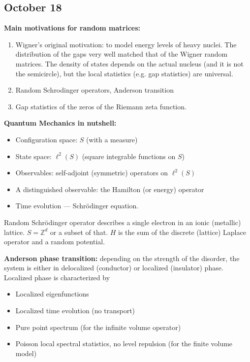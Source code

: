 \documentclass[a4paper]{article}
\begin{document}
\subsection{October 18%
  \label{october-18}%
}

\textbf{Main motivations for random matrices:}

\begin{enumerate}
\item Wigner’s original motivation: to model energy levels of heavy nuclei. The distribution of the gaps very well matched that of the Wigner random matrices. The density of states depends on the actual nucleus (and it is not the semicircle), but the local statistics (e.g. gap statistics) are universal.

\item Random Schrodinger operators, Anderson transition

\item Gap statistics of the zeros of the Riemann zeta function.
\end{enumerate}

\textbf{Quantum Mechanics in nutshell:}

\begin{itemize}
\item Configuration space: $S$ (with a measure)

\item State space: $\ell^2(S)$ (square integrable functions on $S$)

\item Observables: self-adjoint (symmetric) operators on $\ell^2(S)$

\item A distinguished observable: the Hamilton (or energy) operator

\item Time evolution — Schrödinger equation.
\end{itemize}

Random Schrödinger operator describes a single electron in an ionic (metallic) lattice. $S = \mathbb Z^d$ or a subset of that. $H$ is the sum of the discrete (lattice) Laplace operator and a random potential.

\textbf{Anderson phase transition:} depending on the strength of the disorder, the system is either in delocalized (conductor) or localized (insulator) phase. Localized phase is characterized by

\begin{itemize}
\item Localized eigenfunctions

\item Localized time evolution (no transport)

\item Pure point spectrum (for the infinite volume operator)

\item Poisson local spectral statistics, no level repulsion (for the finite volume model)
\end{itemize}
\end{document}
